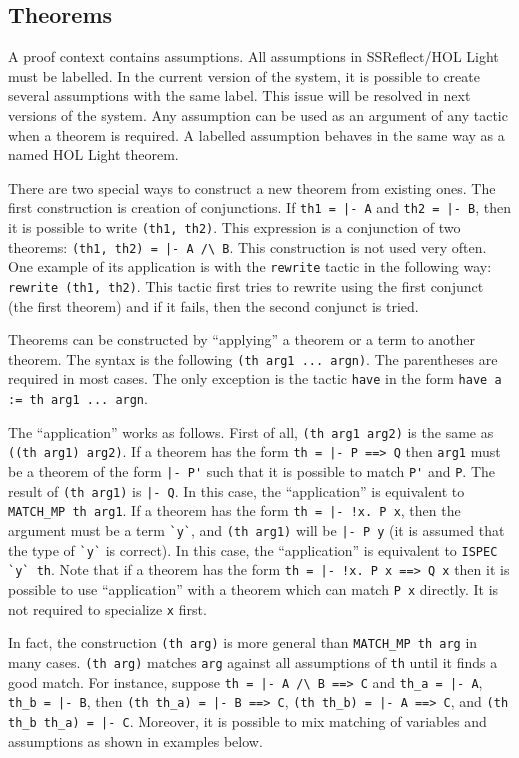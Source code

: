 \documentclass[a4paper]{article}
\begin{document}
\subsection{Theorems}
A proof context contains assumptions. All assumptions in SSReflect/HOL Light must be labelled. In the current version of the system, it is possible to create several assumptions with the same label. This issue will be resolved in next versions of the system. Any assumption can be used as an argument of any tactic when a theorem is required. A labelled assumption behaves in the same way as a named HOL Light theorem.

There are two special ways to construct a new theorem from existing ones. The first construction is creation of conjunctions. If \verb$th1 = |- A$ and \verb$th2 = |- B$, then it is possible to write \verb|(th1, th2)|. This expression is a conjunction of two theorems: \verb$(th1, th2) = |- A /\ B$. This construction is not used very often. One example of its application is with the \verb|rewrite| tactic in the following way: \verb|rewrite (th1, th2)|. This tactic first tries to rewrite using the first conjunct (the first theorem) and if it fails, then the second conjunct is tried.

Theorems can be constructed by ``applying'' a theorem or a term to another theorem. The syntax is the following \verb|(th arg1 ... argn)|. The parentheses are required in most cases. The only exception is the tactic \verb|have| in the form \verb|have a := th arg1 ... argn|.

The ``application'' works as follows. First of all, \verb|(th arg1 arg2)| is the same as \verb|((th arg1) arg2)|. If a theorem has the form \verb$th = |- P ==> Q$ then \verb|arg1| must be a theorem of the form \verb$|- P'$ such that it is possible to match \verb|P'| and \verb|P|. The result of \verb|(th arg1)| is \verb$|- Q$. In this case, the ``application'' is equivalent to \verb|MATCH_MP th arg1|. If a theorem has the form \verb$th = |- !x. P x$, then the argument must be a term \verb|`y`|, and \verb|(th arg1)| will be \verb$|- P y$ (it is assumed that the type of \verb|`y`| is correct). In this case, the ``application'' is equivalent to \verb|ISPEC `y` th|. Note that if a theorem has the form \verb$th = |- !x. P x ==> Q x$ then it is possible to use ``application'' with a theorem which can match \verb|P x| directly. It is not required to specialize \verb|x| first.

In fact, the construction \verb|(th arg)| is more general than \verb|MATCH_MP th arg| in many cases. \verb|(th arg)| matches \verb|arg| against all assumptions of \verb|th| until it finds a good match. For instance, suppose \verb$th = |- A /\ B ==> C$ and \verb$th_a = |- A$, \verb$th_b = |- B$, then \verb$(th th_a) = |- B ==> C$, \verb$(th th_b) = |- A ==> C$, and \verb$(th th_b th_a) = |- C$. Moreover, it is possible to mix matching of variables and assumptions as shown in examples below.
\end{document}
